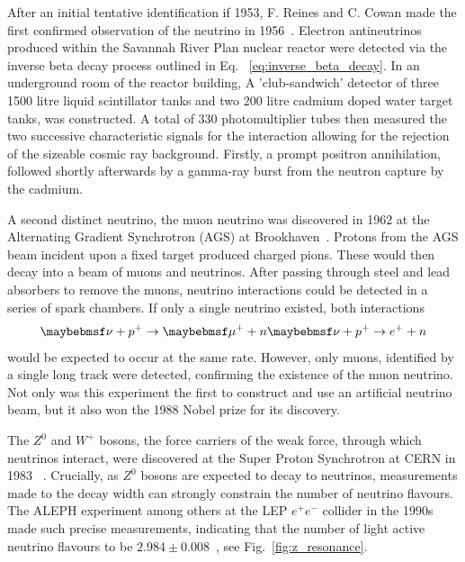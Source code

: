 After an initial tentative identification if 1953, F. Reines and C. Cowan made the first confirmed
observation of the neutrino in 1956~\cite{cowan1956}. Electron antineutrinos produced within the
Savannah River Plan nuclear reactor were detected via the inverse beta decay process outlined in
Eq. ~\ref{eq:inverse_beta_decay}. In an underground room of the reactor building, A
'club-sandwich' detector of three 1500 litre liquid scintillator tanks and two 200 litre cadmium
doped water target tanks, was constructed. A total of 330 photomultiplier tubes then measured the
two successive characteristic signals for the interaction allowing for the rejection of the
sizeable cosmic ray background. Firstly, a prompt positron annihilation, followed shortly
afterwards by a gamma-ray burst from the neutron capture by the cadmium.

A second distinct neutrino, the muon neutrino was discovered in 1962 at the Alternating Gradient
Synchrotron (AGS) at Brookhaven~\cite{danby1962}. Protons from the AGS beam incident upon a fixed
target produced charged pions. These would then decay into a beam of muons and neutrinos. After
passing through steel and lead absorbers to remove the muons, neutrino interactions could be
detected in a series of spark chambers. If only a single neutrino existed, both interactions
\begin{equation} %
    \nu+p^{+}\rightarrow\mu^{+}+n \\
    \nu+p^{+}\rightarrow e^{+}+n
\end{equation} %
would be expected to occur at the same rate. However, only muons, identified by a single long
track were detected, confirming the existence of the muon neutrino. Not only was this experiment
the first to construct and use an artificial neutrino beam, but it also won the 1988 Nobel prize
for its discovery.

The $Z^{0}$ and $W^{+}$ bosons, the force carriers of the weak force, through which neutrinos
interact, were discovered at the Super Proton Synchrotron at CERN in 1983
~\cite{arnison1983_z,arnison1983_w}. Crucially, as $Z^{0}$ bosons are expected to decay to
neutrinos, measurements made to the decay width can strongly constrain the number of neutrino
flavours. The ALEPH experiment among others at the LEP $e^{+}e^{-}$ collider in the 1990s made
such precise measurements, indicating that the number of light active neutrino flavours to be
$2.984\pm0.008$~\cite{electroweak2006}, see Fig.~\ref{fig:z_resonance}.

